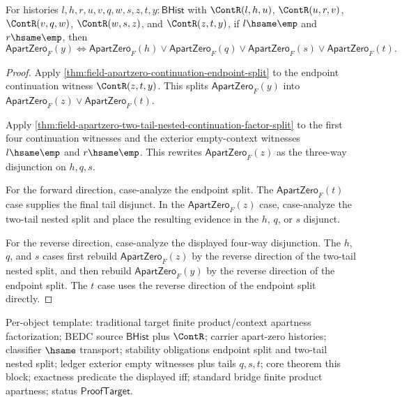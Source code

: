 \begin{theorem}
\label{thm:field-apartzero-three-tail-nested-continuation-factor-split}
For histories $l,h,r,u,v,q,w,s,z,t,y:\mathsf{BHist}$ with
$\ContR(l,h,u)$, $\ContR(u,r,v)$, $\ContR(v,q,w)$, $\ContR(w,s,z)$, and
$\ContR(z,t,y)$, if $l\hsame\emp$ and $r\hsame\emp$, then
$$
\mathsf{ApartZero}_F(y)
\Longleftrightarrow
\mathsf{ApartZero}_F(h)\lor\mathsf{ApartZero}_F(q)\lor
\mathsf{ApartZero}_F(s)\lor\mathsf{ApartZero}_F(t).
$$
\end{theorem}
\begin{proof}
Apply \autoref{thm:field-apartzero-continuation-endpoint-split} to the
endpoint continuation witness $\ContR(z,t,y)$. This splits
$\mathsf{ApartZero}_F(y)$ into
$\mathsf{ApartZero}_F(z)\lor\mathsf{ApartZero}_F(t)$.

Apply
\autoref{thm:field-apartzero-two-tail-nested-continuation-factor-split} to
the first four continuation witnesses and the exterior empty-context
witnesses $l\hsame\emp$ and $r\hsame\emp$. This rewrites
$\mathsf{ApartZero}_F(z)$ as the three-way disjunction on $h,q,s$.

For the forward direction, case-analyze the endpoint split. The
$\mathsf{ApartZero}_F(t)$ case supplies the final tail disjunct. In the
$\mathsf{ApartZero}_F(z)$ case, case-analyze the two-tail nested split and
place the resulting evidence in the $h$, $q$, or $s$ disjunct.

For the reverse direction, case-analyze the displayed four-way disjunction.
The $h$, $q$, and $s$ cases first rebuild $\mathsf{ApartZero}_F(z)$ by the
reverse direction of the two-tail nested split, and then rebuild
$\mathsf{ApartZero}_F(y)$ by the reverse direction of the endpoint split. The
$t$ case uses the reverse direction of the endpoint split directly.
\end{proof}

Per-object template: traditional target finite product/context apartness
factorization; BEDC source $\mathsf{BHist}$ plus $\ContR$; carrier apart-zero
histories; classifier $\hsame$ transport; stability obligations endpoint split
and two-tail nested split; ledger exterior empty witnesses plus tails $q,s,t$;
core theorem this block; exactness predicate the displayed iff; standard
bridge finite product apartness; status $\mathsf{ProofTarget}$.


